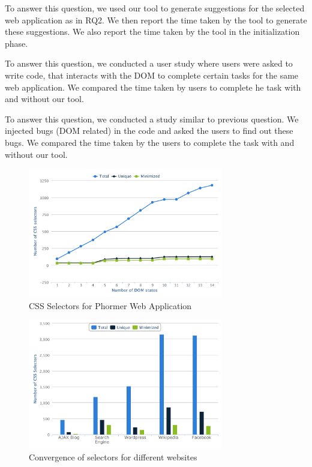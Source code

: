 	 To answer this question, we used our tool to generate suggestions for the selected web application as in RQ2. We then report the time taken by the tool to generate these suggestions. We also report the time taken by the tool in the initialization phase.
		
	 To answer this question, we conducted a user study where users were asked to write \javascript code, that interacts with the DOM to complete certain tasks for the same web application. We compared the time taken by users to complete he task with and without our tool.
	
	 To answer this question, we conducted a study similar to previous question. We injected bugs (DOM related) in the \javascript code and asked the users to find out these bugs. We compared the time taken by the users to complete the task with and without our tool.
	 	
	\begin{figure}
		\centering
		\includegraphics[width=85mm]{images/phormer.pdf}
		\caption{CSS Selectors for Phormer Web Application}
		\label{Fig:Phormer}
	\end{figure}
	
	\begin{figure}
		\centering
		\includegraphics[width=85mm]{images/convergence.pdf}
		\caption{Convergence of \css selectors for different websites}
		\label{Fig:Convergence}
	\end{figure}
		
